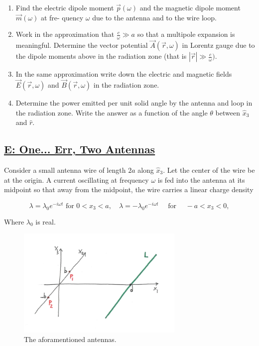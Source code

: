 \begin{enumerate}
	\item  Find the electric dipole moment $\vec{p}(\omega)$ and the magnetic dipole moment $\vec{m}(\omega)$ at fre-
	quency $\omega$ due to the antenna and to the wire loop.
	\item  Work in the approximation that $\frac{c}{\omega} \gg a$ so that a multipole expansion is meaningful. Determine the vector potential $\vec{A}(\vec{r}, \omega)$ in Lorentz gauge due to the dipole moments above in the radiation zone (that is $\left|\vec{r}\right| \gg \frac{c}{\omega})$.
	\item In the same approximation write down the electric and magnetic fields $\vec{E}(\vec{r}, \omega)$ and $\vec{B}(\vec{r}, \omega)$ in the radiation zone.
	\item Determine the power emitted per unit solid angle by the antenna and loop in the radiation zone. Write the answer as a function of the angle $\theta$ between $\hat{x}_{3}$ and $\hat{r}$.
\end{enumerate}

\subsection{\hyperref[E: One... Err, Two Antennas]{E: One... Err, Two Antennas}}

Consider a small antenna wire of length $2 a$ along $\hat{x}_{3} .$ Let the center of the wire be at the origin. A current oscillating at frequency $\omega$ is fed into the antenna at its midpoint so that away from the midpoint, the wire carries a linear charge density

\begin{equation}
	\lambda=\lambda_{0} e^{-i \omega t} \text { for } 0<x_{3}<a, \quad \lambda=-\lambda_{0} e^{-i \omega t} \quad \text { for } \quad-a<x_{3}<0,
\end{equation}

Where $\lambda_{0}$ is real.

\begin{figure}[h]
	\includegraphics[width=8cm]{figures/examdec19p2.png}
	\centering
	\caption{The aforamentioned antennas.}
\end{figure}

